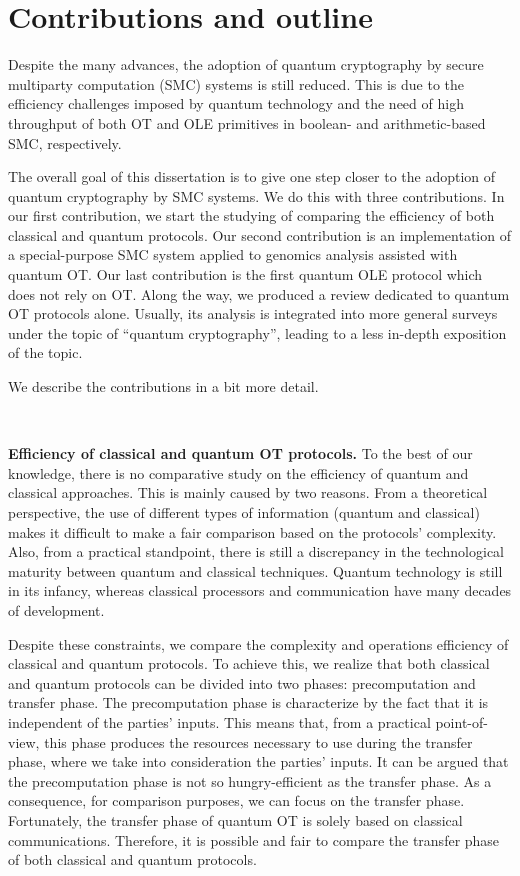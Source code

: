 \section*{Contributions and outline} %

Despite the many advances, the adoption of quantum cryptography by secure multiparty computation (SMC) systems is still reduced. This is due to the efficiency challenges imposed by quantum technology and the need of high throughput of both OT and OLE primitives in boolean- and arithmetic-based SMC, respectively.

The overall goal of this dissertation is to give one step closer to the adoption of quantum cryptography by SMC systems. We do this with three contributions. In our first contribution, we start the studying of comparing the efficiency of both classical and quantum protocols. Our second contribution is an implementation of a special-purpose SMC system applied to genomics analysis assisted with quantum OT. Our last contribution is the first quantum OLE protocol which does not rely on OT. Along the way, we produced a review dedicated to quantum OT protocols alone. Usually, its analysis is integrated into more general surveys under the topic of “quantum cryptography”, leading to a less in-depth exposition of the topic.

We describe the contributions in a bit more detail.

\

\noindent\textbf{Efficiency of classical and quantum OT protocols.} To the best of our knowledge, there is no comparative study on the efficiency of quantum and classical approaches. This is mainly caused by two reasons. From a theoretical perspective, the use of different types of information (quantum and classical) makes it difficult to make a fair comparison based on the protocols' complexity. Also, from a practical standpoint, there is still a discrepancy in the technological maturity between quantum and classical techniques. Quantum technology is still in its infancy,  whereas classical processors and communication have many decades of development. 

Despite these constraints, we compare the complexity and operations efficiency of classical and quantum protocols. To achieve this, we realize that both classical and quantum protocols can be divided into two phases: precomputation and transfer phase. The precomputation phase is characterize by the fact that it is independent of the parties' inputs. This means that, from a practical point-of-view, this phase produces the resources necessary to use during the transfer phase, where we take into consideration the parties' inputs. It can be argued that the precomputation phase is not so hungry-efficient as the transfer phase. As a consequence, for comparison purposes, we can focus on the transfer phase. Fortunately, the transfer phase of quantum OT is solely based on classical communications. Therefore, it is possible and fair to compare the transfer phase of both classical and quantum protocols. 

